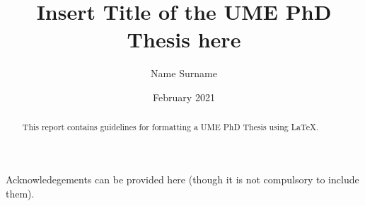 \documentclass{Miscellaneous/IUSS_Thesis_Draft}
\begin{document}
\title{Insert Title of the UME PhD Thesis here} %
\author{Name Surname} %
\date{February 2021}  %
\pagestyle{empty} %
\advisor{} %
\maketitle %
\cleardoublepage %
\maketitle %
\cleardoublepage %

\begin{abstract} %
This report contains guidelines for formatting a UME PhD Thesis using \LaTeX.
\end{abstract} %

\begin{acknowledgements} %
Acknowledegements can be provided here (though it is not compulsory to include them). 
\end{acknowledgements} %

\makeToC %
\makeLoF %
\makeLoT %
\makeLoS %
\cleardoublepage %
\pagestyle{fancy} %



\end{document}

